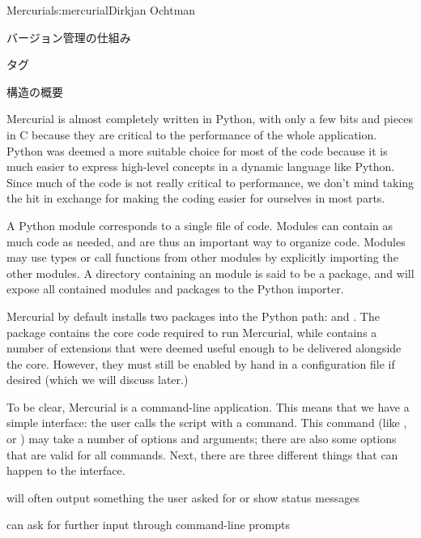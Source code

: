 \begin{aosachapter}{Mercurial}{s:mercurial}{Dirkjan Ochtman}
\begin{aosasect1}{バージョン管理の仕組み}
\begin{aosasect2}{タグ}
\end{aosasect2}

\end{aosasect1}

\begin{aosasect1}{構造の概要}

Mercurial is almost completely written in Python, with only a few bits
and pieces in C because they are critical to the performance of the
whole application. Python was deemed a more suitable choice for most
of the code because it is much easier to express high-level concepts
in a dynamic language like Python. Since much of the code is not
really critical to performance, we don't mind taking the hit in
exchange for making the coding easier for ourselves in most parts.

A Python module corresponds to a single file of code. Modules can
contain as much code as needed, and are thus an important way to
organize code. Modules may use types or call functions from other
modules by explicitly importing the other modules. A directory
containing an  module is said to be a package,
and will expose all contained modules and packages to the Python
importer.

Mercurial by default installs two packages into the Python path:
 and . The  package
contains the core code required to run Mercurial, while 
contains a number of extensions that were deemed useful enough to be
delivered alongside the core. However, they must still be enabled by
hand in a configuration file if desired (which we will discuss later.)

To be clear, Mercurial is a command-line application. This means that
we have a simple interface: the user calls the  script with a
command. This command (like ,  or )
may take a number of options and arguments; there are also some
options that are valid for all commands. Next, there are three
different things that can happen to the interface.

\begin{aosaitemize}

  \item {} will often output something the user asked for or show
  status messages

  \item {} can ask for further input through command-line prompts


\end{aosaitemize}
\end{aosasect1}
\end{aosachapter}
